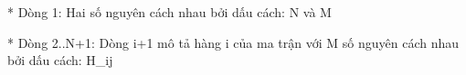 * Dòng 1: Hai số nguyên cách nhau bởi dấu cách: N và M  

   * Dòng 2..N+1: Dòng i+1 mô tả hàng i của ma trận với M số nguyên cách nhau bởi dấu cách: H\_ij